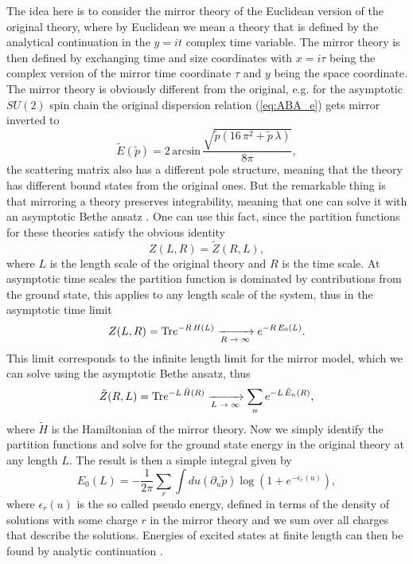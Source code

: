  The idea here is to consider the mirror theory of the Euclidean version of the original theory, where by Euclidean we mean a theory that is defined by the analytical continuation in the $y = i t$ complex time variable. The mirror theory is then defined by exchanging time and size coordinates with $x=i\tau$ being the complex version of the mirror time coordinate $\tau$ and $y$ being the space coordinate. The mirror theory is obviously different from the original, e.g. for the asymptotic $SU(2)$ spin chain the original dispersion relation (\ref{eq:ABA_e}) gets mirror inverted to \cite{frolov}
\begin{equation}
	\tilde{E}(\tilde{p}) = 2 \, \mathrm{arcsin} \, \frac{\sqrt{\tilde{p} \left( 16 \, \pi^2 + \tilde{p} \, \lambda \right)}}{8 \pi},
\end{equation}
the scattering matrix also has a different pole structure, meaning that the theory has different bound states from the original ones. But the remarkable thing is that mirroring a theory preserves integrability, meaning that one can solve it with an asymptotic Bethe ansatz \cite{tba}. One can use this fact, since the partition functions for these theories satisfy the obvious identity
\begin{equation}
	Z(L,R) = \tilde{Z}(R,L),
\end{equation}
where $L$ is the length scale of the original theory and $R$ is the time scale. At asymptotic time scales the partition function is dominated by contributions from the ground state, this applies to any length scale of the system, thus in the asymptotic time limit 
\begin{equation}
	Z(L,R) = \mathrm{Tr} e^{-R \, H(L)} \xrightarrow[\text{$R \rightarrow \infty$}]{} e^{-R \, E_0(L)}.
\end{equation}
This limit corresponds to the infinite length limit for the mirror model, which we can solve using the asymptotic Bethe ansatz, thus
\begin{equation}
	\tilde{Z}(R,L) = \mathrm{Tr} e^{-L \, \tilde{H}(R)} \xrightarrow[\text{$L \rightarrow \infty$}]{}  \sum_n e^{-L \, \tilde{E}_n(R)},
\end{equation}
where $\tilde{H}$ is the Hamiltonian of the mirror theory. Now we simply identify the partition functions and solve for the ground state energy in the original theory at any length $L$. The result is then a simple integral given by \cite{tba}
\begin{equation}
	E_0(L) = - \frac{1}{2 \pi} \sum_r \int du \left( \partial_u \tilde{p} \right) \log \left( 1 + e^{-\epsilon_r(u)} \right), 
\end{equation}
where $\epsilon_r(u)$ is the so called pseudo energy, defined in terms of the density of solutions with some charge $r$ in the mirror theory and we sum over all charges that describe the solutions. Energies of excited states at finite length can then be found by analytic continuation \cite{excited_tba}.

